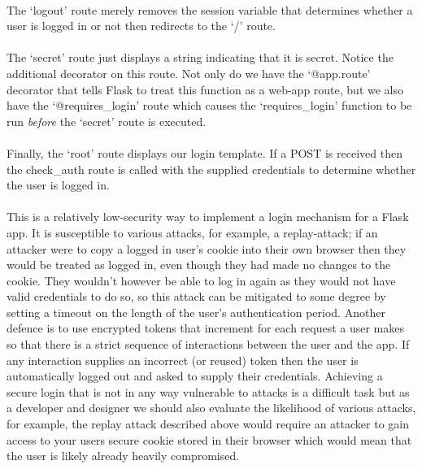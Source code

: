 \documentclass[12pt, a4paper, oneside]{book}
\begin{document}
{\paragraph{} The `logout' route merely removes the session variable that determines whether a user is logged in or not then redirects to the `/' route.

\paragraph{} The `secret' route just displays a string indicating that it is secret. Notice the additional decorator on this route. Not only do we have the `@app.route' decorator that tells Flask to treat this function as a web-app route, but we also have the `@requires\_login' route which causes the `requires\_login' function to be run \emph{before} the `secret' route is executed.

\paragraph{} Finally, the `root' route displays our login template. If a POST is received then the check\_auth route is called with the supplied credentials to determine whether the user is logged in.

\paragraph{} This is a relatively low-security way to implement a login mechanism for a Flask app. It is susceptible to various attacks, for example, a replay-attack; if an attacker were to copy a logged in user's cookie into their own browser then they would be treated as logged in, even though they had made no changes to the cookie. They wouldn't however be able to log in again as they would not have valid credentials to do so, so this attack can be mitigated to some degree by setting a timeout on the length of the user's authentication period. Another defence is to use encrypted tokens that increment for each request a user makes so that there is a strict sequence of interactions between the user and the app. If any interaction supplies an incorrect (or reused) token then the user is automatically logged out and asked to supply their credentials. Achieving a secure login that is not in any way vulnerable to attacks is a difficult task but as a developer and designer we should also evaluate the likelihood of various attacks, for example, the replay attack described above would require an attacker to gain access to your users secure cookie stored in their browser which would mean that the user is likely already heavily compromised.

}
\end{document}
